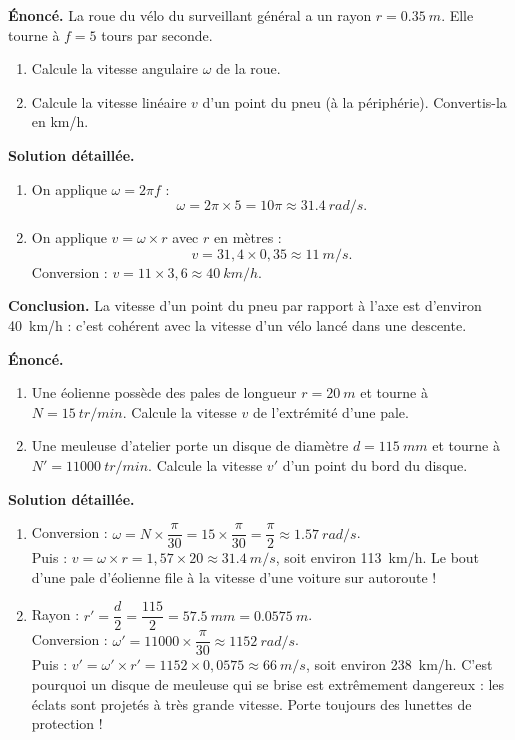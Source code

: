 \documentclass[11pt]{article}
\begin{document}
\begin{exoresolu}
\textbf{Énoncé.} La roue du vélo du surveillant général a un rayon $r = \SI{0,35}{m}$. Elle tourne à $f = 5$ tours par seconde.
\begin{enumerate}
\item Calcule la vitesse angulaire $\omega$ de la roue.
\item Calcule la vitesse linéaire $v$ d'un point du pneu (à la périphérie). Convertis-la en km/h.
\end{enumerate}
\tcblower
\textbf{Solution détaillée.}
\begin{enumerate}
\item On applique $\omega = 2\pi f$ :
\[ \omega = 2\pi \times 5 = 10\pi \approx \SI{31,4}{rad/s}. \]
\item On applique $v = \omega \times r$ avec $r$ en mètres :
\[ v = 31{,}4 \times 0{,}35 \approx \SI{11}{m/s}. \]
Conversion : $v = 11 \times 3{,}6 \approx \SI{40}{km/h}$.
\end{enumerate}
\textbf{Conclusion.} La vitesse d'un point du pneu par rapport à l'axe est d'environ \SI{40}{km/h} : c'est cohérent avec la vitesse d'un vélo lancé dans une descente.
\end{exoresolu}

\begin{exoresolu}
\textbf{Énoncé.}
\begin{enumerate}
\item Une éolienne possède des pales de longueur $r = \SI{20}{m}$ et tourne à $N = \SI{15}{tr/min}$. Calcule la vitesse $v$ de l'extrémité d'une pale.
\item Une meuleuse d'atelier porte un disque de diamètre $d = \SI{115}{mm}$ et tourne à $N' = \SI{11000}{tr/min}$. Calcule la vitesse $v'$ d'un point du bord du disque.
\end{enumerate}
\tcblower
\textbf{Solution détaillée.}
\begin{enumerate}
\item Conversion : $\omega = N \times \dfrac{\pi}{30} = 15 \times \dfrac{\pi}{30} = \dfrac{\pi}{2} \approx \SI{1,57}{rad/s}$. \\
Puis : $v = \omega \times r = 1{,}57 \times 20 \approx \SI{31,4}{m/s}$, soit environ \SI{113}{km/h}. Le bout d'une pale d'éolienne file à la vitesse d'une voiture sur autoroute !
\item Rayon : $r' = \dfrac{d}{2} = \dfrac{115}{2} = \SI{57,5}{mm} = \SI{0,0575}{m}$. \\
Conversion : $\omega' = 11000 \times \dfrac{\pi}{30} \approx \SI{1152}{rad/s}$. \\
Puis : $v' = \omega' \times r' = 1152 \times 0{,}0575 \approx \SI{66}{m/s}$, soit environ \SI{238}{km/h}. C'est pourquoi un disque de meuleuse qui se brise est extrêmement dangereux : les éclats sont projetés à très grande vitesse. Porte toujours des lunettes de protection !
\end{enumerate}
\end{exoresolu}
\end{document}
